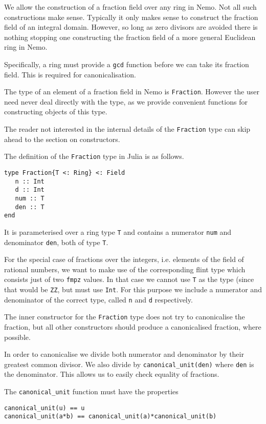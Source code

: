 \documentclass[a4paper,10pt]{article}
\newcommand{\code}{\lstinline}
\begin{document}
{{We allow the construction of a fraction field over any ring in Nemo. Not all
such constructions make sense. Typically it only makes sense to construct the
fraction field of an integral domain. However, so long as zero divisors are
avoided there is nothing stopping one constructing the fraction field of a
more general Euclidean ring in Nemo.

Specifically, a ring must provide a \code{gcd} function before we can take its
fraction field. This is required for canonicalisation.

The type of an element of a fraction field in Nemo is \code{Fraction}. However
the user need never deal directly with the type, as we provide convenient
functions for constructing objects of this type.

The reader not interested in the internal details of the \code{Fraction} type
can skip ahead to the section on constructors.

The definition of the \code{Fraction} type in Julia is as follows.

\begin{lstlisting}
type Fraction{T <: Ring} <: Field
   n :: Int
   d :: Int
   num :: T
   den :: T
end
\end{lstlisting}

It is parameterised over a ring type \code{T} and contains a numerator 
\code{num} and denominator \code{den}, both of type \code{T}.

For the special case of fractions over the integers, i.e. elements of the
field of rational numbers, we want to make use of the corresponding flint
type which consists just of two \code{fmpz} values. In that case we cannot
use \code{T} as the type (since that would be \code{ZZ}, but must use
\code{Int}. For this purpose we include a numerator and denominator of the
correct type, called \code{n} and \code{d} respectively.

The inner constructor for the \code{Fraction} type does not try to canonicalise
the fraction, but all other constructors should produce a canonicalised
fraction, where possible.

In order to canonicalise we divide both numerator and denominator by their
greatest common divisor. We also divide by \code{canonical_unit(den)} where
\code{den} is the denominator. This allows us to easily check equality of
fractions.

The \code{canonical_unit} function must have the properties

\begin{lstlisting}
canonical_unit(u) == u
canonical_unit(a*b) == canonical_unit(a)*canonical_unit(b)
\end{lstlisting}

}}
\end{document}
